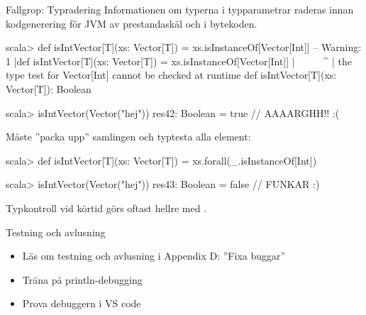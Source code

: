 \begin{Slide}{Fallgrop: Typradering }\SlideFontSmall
Informationen om typerna i typparametrar raderas innan kodgenerering för JVM av prestandaskäl och  i bytekoden.
\vspace{-0.25em}\begin{REPL}
scala> def isIntVector[T](xs: Vector[T]) = xs.isInstanceOf[Vector[Int]]
-- Warning:
1 |def isIntVector[T](xs: Vector[T]) = xs.isInstanceOf[Vector[Int]]
  |                                    ^^^^^^^^^^^^^^^^^^^^^^^^^^^^
  |                the type test for Vector[Int] cannot be checked at runtime
def isIntVector[T](xs: Vector[T]): Boolean

scala> isIntVector(Vector("hej"))
res42: Boolean = true  // AAAARGHH!! :(
\end{REPL}
Måste ''packa upp'' samlingen och typtesta alla element:
\begin{REPL}
scala> def isIntVector[T](xs: Vector[T]) = xs.forall(_.isInstanceOf[Int])

scala> isIntVector(Vector("hej"))
res43: Boolean = false  // FUNKAR :)

\end{REPL}
Typkontroll vid körtid görs oftast hellre med .

\end{Slide}


\begin{Slide}{Testning och avlusning}
\begin{itemize}
\item Läs om testning och avlusning  i Appendix D: ''Fixa buggar'' 
\item Träna på println-debugging
\item Prova debuggern i VS code
\end{itemize}
\end{Slide}




